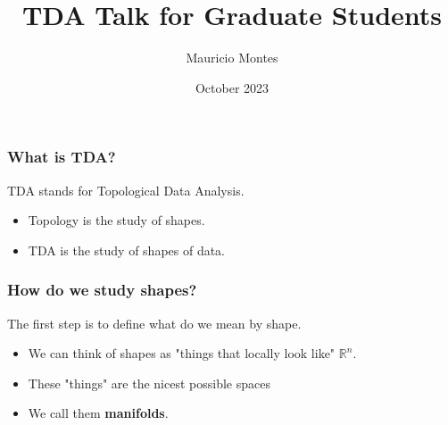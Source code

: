 \documentclass{beamer}
\title{TDA Talk for Graduate Students}
\author{Mauricio Montes}
\institute{Auburn University}
\date{October 2023}
\begin{document}
\frame{\titlepage}

\begin{frame}%

\frametitle{What is TDA?}

TDA stands for Topological Data Analysis.

\pause

\begin{itemize}

  \item Topology is the study of shapes.

  \pause

  \item TDA is the study of shapes of data.

\end{itemize}


\end{frame}

\begin{frame}%

\frametitle{ How do we study shapes? }

\pause

The first step is to define what do we mean by shape.

\pause

\begin{itemize}

  \item We can think of shapes as "things that locally look like" $\mathbb{R}^n$.

  \pause

  \item These "things" are the nicest possible spaces 

  \pause

  \item We call them \textbf{manifolds}.

\end{itemize}

\end{frame}
\end{document}
